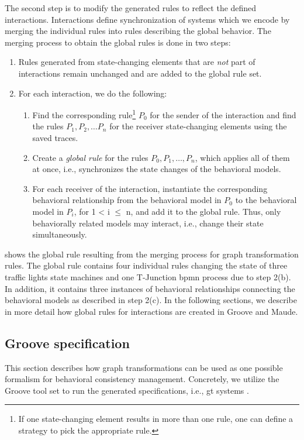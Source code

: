 \documentclass{jot}
\begin{document}
The second step is to modify the generated rules to reflect the defined interactions.
Interactions define synchronization of systems which we encode by merging the individual rules into rules describing the global behavior.
The merging process to obtain the global rules is done in two steps:

\begin{enumerate}
    \item Rules generated from state-changing elements that are \textit{not} part of interactions remain unchanged and are added to the global rule set.
    \item For each interaction, we do the following:
     \begin{enumerate}
         \item Find the corresponding rule\footnote{If one state-changing element results in more than one rule, one can define a strategy to pick the appropriate rule.} $P_0$ for the sender of the interaction and find the rules $P_1, P_2, \ldots P_n$ for the receiver state-changing elements using the saved traces.
         \item Create a \emph{global rule} for the rules $P_0, P_1, \ldots, P_n$, which applies all of them at once, i.e., synchronizes the state changes of the behavioral models.
         \item For each receiver of the interaction, instantiate the corresponding behavioral relationship from the behavioral model in $P_0$ to the behavioral model in $P_i$, for 1 < i $\leq$ n, and add it to the global rule.
         Thus, only behaviorally related models may interact, i.e., change their state simultaneously.
     \end{enumerate}
\end{enumerate}

 shows the global rule resulting from the merging process for graph transformation rules.
The global rule contains four individual rules changing the state of three traffic lights state machines and one T-Junction \gls*{bpmn} process due to step 2(b).
In addition, it contains three instances of behavioral relationships connecting the behavioral models as described in step 2(c). 
In the following sections, we describe in more detail how global rules for interactions are created in Groove and Maude.


\subsection{Groove specification} 
This section describes how graph transformations can be used as one possible formalism for behavioral consistency management.
Concretely, we utilize the Groove tool set to run the generated specifications, i.e., \gls*{gt} systems \cite{rensinkGROOVESimulatorTool2004}.
\end{document}
